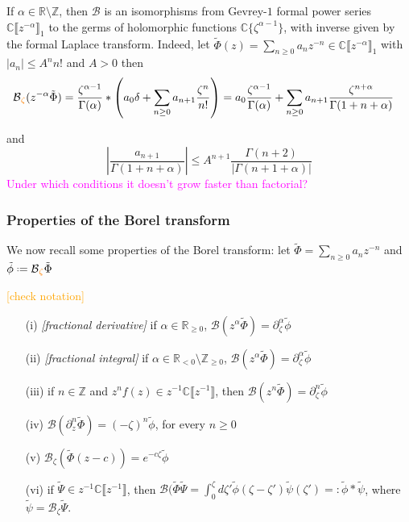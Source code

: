 \documentclass{article}
\theoremstyle{definition}
\newcommand{\Z}{\mathbb{Z}}
\newcommand{\R}{\mathbb{R}}
\newcommand{\C}{\mathbb{C}}
\newcommand*{\defeq}{\mathrel{\vcenter{\baselineskip0.5ex \lineskiplimit0pt
                     \hbox{\scriptsize.}\hbox{\scriptsize.}}}%
                     =}
\newcommand{\borel}{\mathcal{B}}
\begin{document}
If $\alpha\in\mathbb{R}\setminus\Z$, then $\borel$ is an isomorphisms from Gevrey-$1$ formal power series $\C \llbracket z^{-\alpha} \rrbracket_1$ to the germs of holomorphic functions $\C \lbrace \zeta^{\alpha-1} \rbrace$, with inverse given by the formal Laplace transform. Indeed, let $\tilde{\Phi}(z)=\sum_{n\geq 0}a_nz^{-n}\in\C \llbracket z^{-\alpha} \rrbracket_1$ with $|a_n|\leq A^n n!$ and $A>0$ then  
\begin{align*}
\borel\textcolor{orange}{_\zeta} (z^{-\alpha}\tilde{\Phi})&=\frac{\zeta^{\alpha-1}}{\Gamma(\alpha)}\ast\left(a_0\delta+\sum_{n\geq 0}a_{n+1}\frac{\zeta^n}{n!}\right)=a_0\frac{\zeta^{\alpha-1}}{\Gamma(\alpha)}+\sum_{n\geq 0}a_{n+1}\frac{\zeta^{n+\alpha}}{\Gamma(1+n+\alpha)}
\end{align*}  

and \[\left|\frac{a_{n+1}}{\Gamma(1+n+\alpha)}\right|\leq A^{n+1}\frac{\Gamma(n+2)}{|\Gamma(n+1+\alpha)|} \]
\textcolor{magenta}{Under which conditions it doesn't grow faster than factorial?}

\subsubsection{Properties of the Borel transform}
We now recall some properties of the Borel transform: let $\tilde{\Phi}=\sum_{n\geq 0}a_nz^{-n}$ and $\tilde{\phi}\defeq\borel\textcolor{orange}{_\zeta}\tilde{\Phi}$

\textcolor{orange}{[check notation]}

\begin{itemize}
\item[(i)] \emph{[fractional derivative]} if $\alpha\in\R_{\geq 0}$, $\borel\left(z^\alpha \tilde{\Phi}\right)=\partial_{\zeta}^{\alpha}\tilde{\phi}$
\item[(ii)] \emph{[fractional integral]} if $\alpha\in\R_{<0}\setminus\Z_{\geq 0}$, $\borel\left(z^\alpha \tilde{\Phi}\right)=\partial_{\zeta}^{\alpha}\tilde{\phi}$
\item[(iii)] if $n\in\Z$ and $z^nf(z)\in z^{-1}\C \llbracket z^{-1} \rrbracket$, then $\borel(z^n\tilde{\Phi})=\partial_\zeta^n\tilde{\phi}$ 
\item[(iv)] $\borel\left(\partial_z^{n} \tilde{\Phi}\right)=(-\zeta)^n\tilde{\phi}$, for every $n\geq 0$
\item[(v)] $\borel_{\zeta}(\tilde{\Phi}(z-c))=e^{-c\zeta}\tilde{\phi}$
\item[(vi)] if $\tilde{\Psi}\in z^{-1}\C \llbracket z^{-1} \rrbracket$, then $\borel(\tilde{\Phi}\tilde{\Psi}=\int_0^{\zeta}d\zeta' \tilde{\phi}(\zeta-\zeta')\tilde{\psi}(\zeta')=:\tilde{\phi}\ast \tilde{\psi}$, where $\tilde{\psi}=\borel_{\zeta}\tilde{\Psi}$.
\end{itemize} 
\end{document}
